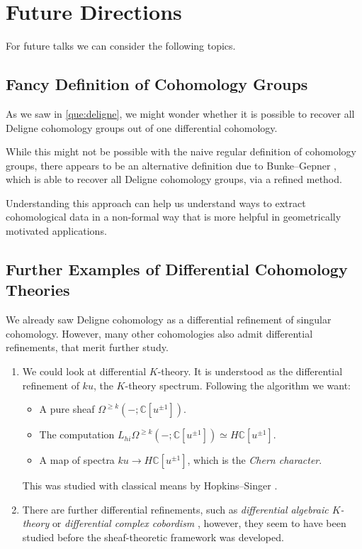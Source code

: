 \documentclass[10pt]{amsart}
\newcommand{\bC}{\mathbb{C}}
\theoremstyle{definition}
\theoremstyle{remark}
\numberwithin{equation}{section}
\begin{document}
\section{Future Directions}
For future talks we can consider the following topics.

\subsection{Fancy Definition of Cohomology Groups}

As we saw in \cref{que:deligne}, we might wonder whether it is possible to recover all Deligne cohomology groups out of one differential cohomology. 

While this might not be possible with the naive regular definition of cohomology groups, there appears to be an alternative definition due to Bunke--Gepner \cite{bunkegepner2021diffktheory}, which is able to recover all Deligne cohomology groups, via a refined method.

Understanding this approach can help us understand ways to extract cohomological data in a non-formal way that is more helpful in geometrically motivated applications.

\subsection{Further Examples of Differential Cohomology Theories}
We already saw Deligne cohomology as a differential refinement of singular cohomology. However, many other cohomologies also admit differential refinements, that merit further study.
\begin{enumerate}
  \item We could look at differential $K$-theory. It is understood as the differential refinement of $ku$, the $K$-theory spectrum. Following the algorithm we want:
  \begin{itemize}
   \item A pure sheaf $\Omega^{\geq k}(- ;\mathbb{C}[u^{\pm 1}])$.
   \item The computation $L_{hi}\Omega^{\geq k}(- ;\mathbb{C}[u^{\pm 1}]) \simeq H\bC[u^{\pm 1}]$.
   \item A map of spectra $ku \to H\bC[u^{\pm 1}]$, which is the \emph{Chern character}.
  \end{itemize}
  This was studied with classical means by Hopkins--Singer \cite{hopkinssinger2005diffcoh}.
  \item There are further differential refinements, such as \emph{differential algebraic $K$-theory} \cite{bunkegepner2021diffktheory} or \emph{differential complex cobordism} \cite{bunkeschickschroederwiethaup2009landweber}, however, they seem to have been studied before the sheaf-theoretic framework was developed.
\end{enumerate}
\end{document}
